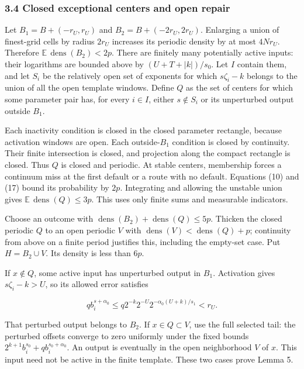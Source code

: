 \documentclass[
  11pt,
]{article}
\begin{document}
\subsubsection{3.4 Closed exceptional centers and open
repair}\label{closed-exceptional-centers-and-open-repair}

Let \(B_1=B+(-r_U,r_U)\) and \(B_2=B+(-2r_U,2r_U)\). Enlarging a union
of finest-grid cells by radius \(2r_U\) increases its periodic density
by at most \(4Nr_U\). Therefore
\(\mathbb E\,\operatorname{dens}(B_2)<2p\). There are finitely many
potentially active inputs: their logarithms are bounded above by
\((U+T+|k|)/s_0\). Let \(I\) contain them, and let \(S_i\) be the
relatively open set of exponents for which \(s\zeta _i-k\) belongs to
the union of all the open template windows. Define \(Q\) as the set of
centers for which some parameter pair has, for every \(i\in I\), either
\(s\notin S_i\) or its unperturbed output outside \(B_1\).

Each inactivity condition is closed in the closed parameter rectangle,
because activation windows are open. Each outside-\(B_1\) condition is
closed by continuity. Their finite intersection is closed, and
projection along the compact rectangle is closed. Thus \(Q\) is closed
and periodic. At stable centers, membership forces a continuum miss at
the first default or a route with no default. Equations (10) and (17)
bound its probability by \(2p\). Integrating and allowing the unstable
union gives \(\mathbb E\,\operatorname{dens}(Q)\le 3p\). This uses only
finite sums and measurable indicators.

Choose an outcome with
\(\operatorname{dens}(B_2)+\operatorname{dens}(Q)\le 5p\). Thicken the
closed periodic \(Q\) to an open periodic \(V\) with
\(\operatorname{dens}(V)<\operatorname{dens}(Q)+p\); continuity from
above on a finite period justifies this, including the empty-set case.
Put \(H=B_2\cup V\). Its density is less than \(6p\).

If \(x\notin Q\), some active input has unperturbed output in \(B_1\).
Activation gives \(s\zeta _i-k>U\), so its allowed error satisfies

\[
 q b_i^{s+\alpha_0}
 \le q2^{-k}2^{-U}2^{-\alpha_0(U+k)/s_1}<r_U.              \tag{18}
\]

That perturbed output belongs to \(B_2\). If \(x\in Q\subset V\), use
the full selected tail: the perturbed offsets converge to zero uniformly
under the fixed bounds \(2^{k+1}b_i^{s_0}+q b_i^{s_0+\alpha _0}\). An
output is eventually in the open neighborhood \(V\) of \(x\). This input
need not be active in the finite template. These two cases prove Lemma
5.
\end{document}
